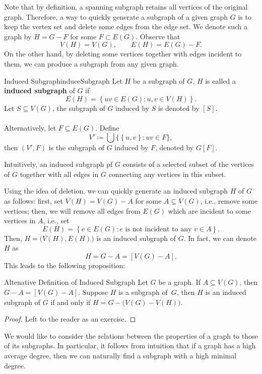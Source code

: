 \documentclass[math]{amznotes}
\theoremstyle{remark}
\newcommand{\0}{\mathbf{0}}
\newcommand{\1}{\mathbf{1}}
\begin{document}
Note that by definition, a spanning subgraph retains all vertices of the original graph. Therefore, a way to quickly generate a subgraph of a given graph $G$ is to keep the vertex set and delete some edges from the edge set. We denote such a graph by $H = G - F$ for some $F \subset E(G)$. Observe that 
\begin{equation*}
    V(H) = V(G), \qquad E(H) = E(G) - F.
\end{equation*}
On the other hand, by deleting some vertices together with edges incident to them, we can produce a subgraph from any given graph.
\begin{dfnbox}{Induced Subgraph}{induceSubgraph}
    Let $H$ be a subgraph of $G$. $H$ is called a {\color{red} \textbf{induced subgraph}} of $G$ if
    \begin{equation*}
        E(H) = \left\{uv \in E(G) \colon u, v \in V(H)\right\}.
    \end{equation*}
    Let $S \subseteq V(G)$, the subgraph of $G$ induced by $S$ is denoted by $[S]$.
    \\\\
    Alternatively, let $F \subseteq E(G)$. Define
    \begin{equation*}
        V' \coloneqq \bigcup \bigl\{\left\{u, v\right\} \colon uv \in F\bigr\},
    \end{equation*}
    then $(V', F)$ is the subgraph of $G$ induced by $F$, denoted by $G[F]$.
\end{dfnbox}
Intuitively, an induced subgraph pf $G$ consists of a selected subset of the vertices of $G$ together with all edges in $G$ connecting any vertices in this subset.

Using the idea of deletion, we can quickly generate an induced subgraph $H$ of $G$ as follows: first, set $V(H) = V(G) - A$ for some $A \subseteq V(G)$, i.e., remove some vertices; then, we will remove all edges from $E(G)$ which are incident to some vertices in $A$, i.e., set
\begin{equation*}
    E(H) = \left\{e \in E(G) \colon e \textrm{ is not incident to any } v \in A\right\}.
\end{equation*}
Then, $H = \bigl(V(H), E(H)\bigr)$ is an induced subgraph of $G$. In fact, we can denote $H$ as
\begin{equation*}
    H = G - A = [V(G) - A].
\end{equation*}
This leads to the following proposition:
\begin{probox}{Altenative Definition of Induced Subgraph}{}
    Let $G$ be a graph. If $A \subseteq V(G)$, then $G - A = [V(G) - A]$. Suppose $H$ is a subgraph of~$G$, then $H$ is an induced subgraph of $G$ if and only if $H = G - \bigl(V(G) - V(H)\bigr)$.
    \tcblower
    \begin{proof}
        Left to the reader as an exercise.
    \end{proof}
\end{probox}
We would like to consider the relations between the properties of a graph to those of its subgraphs. In particular, it follows from intuition that if a graph has a high average degree, then we can naturally find a subgraph with a high minimal degree.
\end{document}
